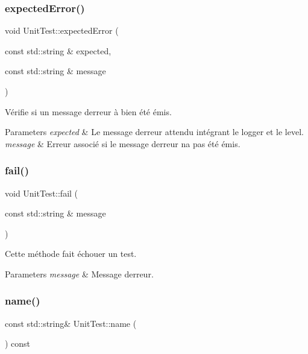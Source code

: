 \subsubsection{\texorpdfstring{expected\+Error()}{expectedError()}\hspace{0.1cm}{\footnotesize\ttfamily [2/2]}}
{\footnotesize\ttfamily void Unit\+Test\+::expected\+Error (\begin{DoxyParamCaption}\item[{const std\+::string \&}]{expected,  }\item[{const std\+::string \&}]{message }\end{DoxyParamCaption})}



Vérifie si un message d\textquotesingle{}erreur à bien été émis. 


\begin{DoxyParams}{Parameters}
{\em expected} & Le message d\textquotesingle{}erreur attendu intégrant le logger et le level. \\
\hline
{\em message} & Erreur associé si le message d\textquotesingle{}erreur n\textquotesingle{}a pas été émis. \\
\hline
\end{DoxyParams}
\mbox{\label{classUnitTest_aae657d6d8bdc56cb2a9d4e4e9f5f8929}} 
\subsubsection{\texorpdfstring{fail()}{fail()}}
{\footnotesize\ttfamily void Unit\+Test\+::fail (\begin{DoxyParamCaption}\item[{const std\+::string \&}]{message }\end{DoxyParamCaption})}



Cette méthode fait échouer un test. 


\begin{DoxyParams}{Parameters}
{\em message} & Message d\textquotesingle{}erreur. \\
\hline
\end{DoxyParams}
\mbox{\label{classUnitTest_a6582f12faa929906359112ac916263ea}} 
\subsubsection{\texorpdfstring{name()}{name()}}
{\footnotesize\ttfamily const std\+::string\& Unit\+Test\+::name (\begin{DoxyParamCaption}{ }\end{DoxyParamCaption}) const\hspace{0.3cm}{\ttfamily [inline]}}




